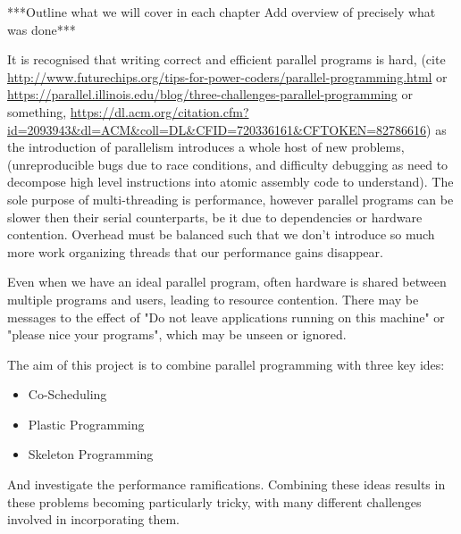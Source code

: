 
***Outline what we will cover in each chapter
Add overview of precisely what was done***

It is recognised that writing correct and efficient parallel programs is hard, (cite \url{http://www.futurechips.org/tips-for-power-coders/parallel-programming.html} or \url{https://parallel.illinois.edu/blog/three-challenges-parallel-programming} or something, \url{https://dl.acm.org/citation.cfm?id=2093943&dl=ACM&coll=DL&CFID=720336161&CFTOKEN=82786616}) as the introduction of parallelism introduces a whole host of new problems, (unreproducible bugs due to race conditions, and difficulty debugging as need to decompose high level instructions into atomic assembly code to understand). The sole purpose of multi-threading is performance, however parallel programs can be slower then their serial counterparts, be it due to dependencies or hardware contention. Overhead must be balanced such that we don't introduce so much more work organizing threads that our performance gains disappear.

Even when we have an ideal parallel program, often hardware is shared between multiple programs and users, leading to resource contention. There may be messages to the effect of "Do not leave applications running on this machine" or "please nice your programs", which may be unseen or ignored.

The aim of this project is to combine parallel programming with three key ides:

\begin{itemize}
	\item Co-Scheduling
	\item Plastic Programming
	\item Skeleton Programming
\end{itemize}

And investigate the performance ramifications. Combining these ideas results in these problems becoming particularly tricky, with many different challenges involved in incorporating them.